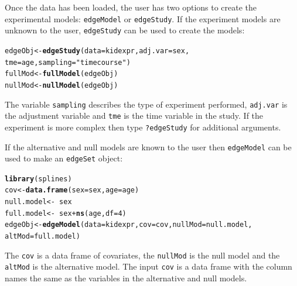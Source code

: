 \documentclass{article}\usepackage[]{graphicx}\usepackage[]{color}
\makeatletter
\newcommand{\hlnum}[1]{\textcolor[rgb]{0.686,0.059,0.569}{#1}}%
\newcommand{\hlstr}[1]{\textcolor[rgb]{0.192,0.494,0.8}{#1}}%
\newcommand{\hlopt}[1]{\textcolor[rgb]{0,0,0}{#1}}%
\newcommand{\hlstd}[1]{\textcolor[rgb]{0.345,0.345,0.345}{#1}}%
\newcommand{\hlkwb}[1]{\textcolor[rgb]{0.69,0.353,0.396}{#1}}%
\newcommand{\hlkwc}[1]{\textcolor[rgb]{0.333,0.667,0.333}{#1}}%
\newcommand{\hlkwd}[1]{\textcolor[rgb]{0.737,0.353,0.396}{\textbf{#1}}}%
\newenvironment{kframe}{%
 \def\at@end@of@kframe{}%
 \ifinner\ifhmode%
  \def\at@end@of@kframe{\end{minipage}}%
  \begin{minipage}{\columnwidth}%
 \fi\fi%
 \def\FrameCommand##1{\hskip\@totalleftmargin \hskip-\fboxsep
 \colorbox{shadecolor}{##1}\hskip-\fboxsep
     \hskip-\linewidth \hskip-\@totalleftmargin \hskip\columnwidth}%
 \MakeFramed {\advance\hsize-\width
   \@totalleftmargin\z@ \linewidth\hsize
   \@setminipage}}%
 {\par\unskip\endMakeFramed%
 \at@end@of@kframe}
\newenvironment{knitrout}{}{} %
\makeatother
\begin{document}
Once the data has been loaded, the user has two options to create the experimental models: {\tt edgeModel} or {\tt edgeStudy}. If the experiment models are unknown to the user, {\tt edgeStudy} can be used to create the models:
\begin{knitrout}
\color{fgcolor}\begin{kframe}
\begin{alltt}
\hlstd{edgeObj} \hlkwb{<-} \hlkwd{edgeStudy}\hlstd{(}\hlkwc{data} \hlstd{= kidexpr,} \hlkwc{adj.var} \hlstd{= sex,}
    \hlkwc{tme} \hlstd{= age,} \hlkwc{sampling} \hlstd{=} \hlstr{"timecourse"}\hlstd{)}
\hlstd{fullMod} \hlkwb{<-} \hlkwd{fullModel}\hlstd{(edgeObj)}
\hlstd{nullMod} \hlkwb{<-} \hlkwd{nullModel}\hlstd{(edgeObj)}
\end{alltt}
\end{kframe}
\end{knitrout}
The variable {\tt sampling} describes the type of experiment performed, {\tt adj.var} is the adjustment variable and {\tt tme} is the time variable in the study. If the experiment is more complex then type {\tt ?edgeStudy} for additional arguments.  

If the alternative and null models are known to the user then {\tt edgeModel} can be used to make an {\tt edgeSet} object:
\begin{knitrout}
\color{fgcolor}\begin{kframe}
\begin{alltt}
\hlkwd{library}\hlstd{(splines)}
\hlstd{cov} \hlkwb{<-} \hlkwd{data.frame}\hlstd{(}\hlkwc{sex} \hlstd{= sex,} \hlkwc{age} \hlstd{= age)}
\hlstd{null.model} \hlkwb{<-} \hlopt{~}\hlstd{sex}
\hlstd{full.model} \hlkwb{<-} \hlopt{~}\hlstd{sex} \hlopt{+} \hlkwd{ns}\hlstd{(age,} \hlkwc{df} \hlstd{=} \hlnum{4}\hlstd{)}
\hlstd{edgeObj} \hlkwb{<-} \hlkwd{edgeModel}\hlstd{(}\hlkwc{data} \hlstd{= kidexpr,} \hlkwc{cov} \hlstd{= cov,} \hlkwc{nullMod} \hlstd{= null.model,}
    \hlkwc{altMod} \hlstd{= full.model)}
\end{alltt}
\end{kframe}
\end{knitrout}
The {\tt cov} is a data frame of covariates, the {\tt nullMod} is the null model and the {\tt altMod} is the alternative model. The input {\tt cov} is a data frame with the column names the same as the variables in the alternative and null models.
\end{document}
